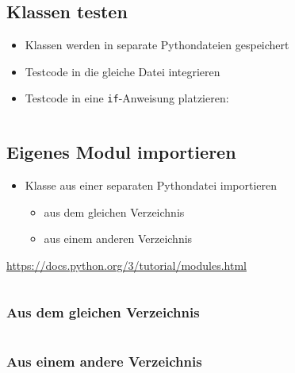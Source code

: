 \begin{minipage}[t]{0.54\textwidth}
	\subsection{Klassen testen}
	\begin{itemize}
		\item Klassen werden in separate Pythondateien gespeichert
		\item Testcode in die gleiche Datei integrieren
		\item Testcode in eine \texttt{if}-Anweisung platzieren:
	\end{itemize}
\end{minipage}
\begin{minipage}[t]{0.02\textwidth} $\quad$ \end{minipage}
\begin{minipage}[t]{0.44\textwidth}
	
\end{minipage}

\begin{minipage}[t]{0.49\textwidth}
	
	\subsection{Eigenes Modul importieren}
	\begin{itemize}
		\item Klasse aus einer separaten Pythondatei importieren
		\begin{itemize}
			\item aus dem gleichen Verzeichnis
			\item aus einem anderen Verzeichnis
		\end{itemize}
	\end{itemize}
	\url{https://docs.python.org/3/tutorial/modules.html}\\
\end{minipage}
\begin{minipage}[t]{0.02\textwidth} $\quad$ \end{minipage}
\begin{minipage}[t]{0.49\textwidth}
	
\end{minipage}



\begin{minipage}[t]{0.49\textwidth}
	\subsubsection{Aus dem gleichen Verzeichnis}
	
\end{minipage}
\begin{minipage}[t]{0.02\textwidth} $\quad$ \end{minipage}
\begin{minipage}[t]{0.49\textwidth}
	\subsubsection{Aus einem andere Verzeichnis}
	
\end{minipage}
